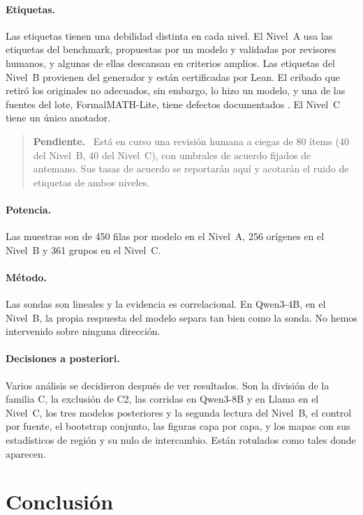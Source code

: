 \documentclass[10pt]{article}
\newenvironment{pendiente}{\begin{quote}\small\noindent\textbf{Pendiente.}\ }{\end{quote}}
\begin{document}
\paragraph{Etiquetas.}
Las etiquetas tienen una debilidad distinta en cada nivel. El Nivel~A usa las etiquetas del benchmark, propuestas
por un modelo y validadas por revisores humanos, y algunas de ellas descansan en criterios amplios. Las etiquetas
del Nivel~B provienen del generador y están certificadas por Lean. El cribado que retiró los originales no
adecuados, sin embargo, lo hizo un modelo, y una de las fuentes del lote, FormalMATH-Lite, tiene defectos
documentados \citep{ammanamanchi2026faults}.
El Nivel~C tiene un único anotador.

\begin{pendiente}
Está en curso una revisión humana a ciegas de 80 ítems (40 del Nivel~B, 40 del Nivel~C), con umbrales de acuerdo fijados de antemano.
Sus tasas de acuerdo se reportarán aquí y acotarán el ruido de etiquetas de ambos niveles.
\end{pendiente}

\paragraph{Potencia.}
Las muestras son de 450 filas por modelo en el Nivel~A, 256 orígenes en el Nivel~B y 361 grupos en el Nivel~C.

\paragraph{Método.}
Las sondas son lineales y la evidencia es correlacional. En Qwen3-4B, en el Nivel~B, la propia respuesta del modelo
separa tan bien como la sonda. No hemos intervenido sobre ninguna dirección.

\paragraph{Decisiones a posteriori.}
Varios análisis se decidieron después de ver resultados. Son la división de la familia C, la exclusión de C2, las
corridas en Qwen3-8B y en Llama en el Nivel~C, los tres modelos posteriores y la segunda lectura del Nivel~B, el
control por fuente, el bootstrap conjunto, las figuras capa por capa, y los mapas con sus estadísticos de región y
su nulo de intercambio. Están rotulados como tales donde aparecen.

\section{Conclusión}
\end{document}
